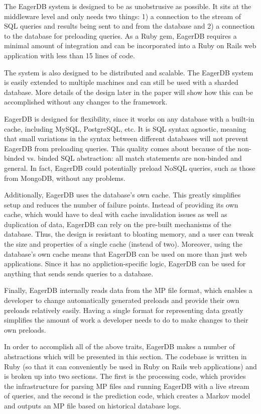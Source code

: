 \documentclass[12pt]{article}
\begin{document}
The EagerDB system is designed to be as unobstrusive as possible. It sits at the middleware level and only needs two things: 1) a connection to the stream of SQL queries and results being sent to and from the database and 2) a connection to the database for preloading queries. As a Ruby gem, EagerDB requires a minimal amount of integration and can be incorporated into a Ruby on Rails web application with less than 15 lines of code.

The system is also designed to be distributed and scalable. The EagerDB system is easily extended to multiple machines and can still be used with a sharded database. More details of the design later in the paper will show how this can be accomplished without any changes to the framework.

EagerDB is designed for flexibility, since it works on any database with a built-in cache, including MySQL, PostgreSQL, etc. It is SQL syntax agnostic, meaning that small variations in the syntax between different databases will not prevent EagerDB from preloading queries. This quality comes about because of the non-binded vs. binded SQL abstraction: all match statements are non-binded and general. In fact, EagerDB could potentially preload NoSQL queries, such as those from MongoDB, without any problems.

Additionally, EagerDB uses the database's own cache. This greatly simplifies setup and reduces the number of failure points. Instead of providing its own cache, which would have to deal with cache invalidation issues as well as duplication of data, EagerDB can rely on the pre-built mechanisms of the database. Thus, the design is resistant to bloating memory, and a user can tweak the size and properties of a single cache (instead of two). Moreover, using the database's own cache means that EagerDB can be used on more than just web applications. Since it has no appliction-specific logic, EagerDB can be used for anything that sends sends queries to a database.

Finally, EagerDB internally reads data from the MP file format, which enables a developer to change automatically generated preloads and provide their own preloads relatively easily. Having a single format for representing data greatly simplifies the amount of work a developer needs to do to make changes to their own preloads.

In order to accomplish all of the above traits, EagerDB makes a number of abstractions which will be presented in this section. The codebase is written in Ruby (so that it can conveniently be used in Ruby on Rails web applications) and is broken up into two sections. The first is the processing code, which provides the infrastructure for parsing MP files and running EagerDB with a live stream of queries, and the second is the prediction code, which creates a Markov model and outputs an MP file based on historical database logs.
\end{document}
